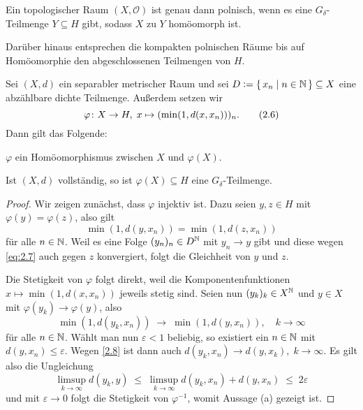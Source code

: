 \documentclass[../main/main.tex]{subfiles}
\begin{document}
	\begin{Satz}
		Ein topologischer Raum $(X, \mathcal{O})$ ist genau dann polnisch, wenn es eine $G_\delta$-Teilmenge $Y \subseteq H$ gibt, sodass $X$ zu $Y$ homöomorph ist. 
		
		Darüber hinaus entsprechen die kompakten polnischen Räume bis auf Homöomorphie den abgeschlossenen Teilmengen von $H$.
	\end{Satz}

	\begin{Hilfssatz}
		Sei $(X, d)$ ein separabler metrischer Raum und sei $D \vcentcolon = \left\{\, x_n \; | \; n \in \mathbb{N} \,\right\} \subseteq X$ eine abzählbare dichte Teilmenge. Außerdem setzen wir
		\[\varphi \colon X \to H, \; x \mapsto (\min(1, d(x, x_n)))_n  \text{.} \label{eq:2.6} \tag{2.6}\]
		Dann gilt das Folgende:
		\begin{enumeratethm}
			\item $\varphi$ ein Homöomorphismus zwischen $X$ und $\varphi(X)$.
			\item Ist $(X, d)$ vollständig, so ist $\varphi(X) \subseteq H$ eine $G_\delta$-Teilmenge.
		\end{enumeratethm}
	\end{Hilfssatz}

	\begin{proof}
		Wir zeigen zunächst, dass $\varphi$ injektiv ist. Dazu seien $y, z \in H$ mit $\varphi(y) = \varphi(z)$, also gilt
		\[\min(1, d(y, x_n)) = \min(1, d(z, x_n)) \label{eq:2.7} \tag{2.7}\]
		für alle $n \in \mathbb{N}$. Weil es eine Folge $(y_n)_n \in D^{\mathbb{N}}$ mit $y_n \to y$ gibt und diese wegen \eqref{eq:2.7} auch gegen $z$ konvergiert, folgt die Gleichheit von $y$ und $z$.
		
		Die Stetigkeit von $\varphi$ folgt direkt, weil die Komponentenfunktionen $x \mapsto \min(1, d(x, x_n))$ jeweils stetig sind. 
		Seien nun $(y_k)_k \in X^{\mathbb{N}}$ und $y \in X$ mit $\varphi(y_k) \to \varphi(y)$, also
		\[\min(1, d(y_k, x_n)) \; \to \; \min(1, d(y, x_n)), \quad k \to \infty \label{2.8} \tag{2.8}\]
		für alle $n \in \mathbb{N}$. Wählt man nun $\varepsilon < 1$ beliebig, so existiert ein $n \in \mathbb{N}$ mit $d(y, x_n) \leq \varepsilon$. Wegen \eqref{2.8} ist dann auch
		$d(y_k, x_n) \to d(y, x_k), \; k \to \infty$. Es gilt also die Ungleichung
		$$\limsup_{k \to \infty} d(y_k, y) \; \leq \; \limsup_{k \to \infty} d(y_k, x_n) + d(y, x_n) \; \leq \; 2\varepsilon$$
		und mit $\varepsilon \to 0$ folgt die Stetigkeit von $\varphi^{-1}$, womit Aussage (a) gezeigt ist.
	\end{proof}

	
	
\end{document}

